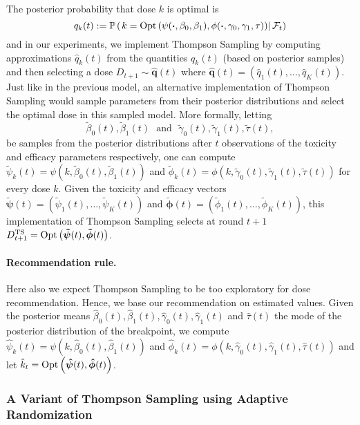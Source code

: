 The posterior probability that dose $k$ is optimal is 
\[{q}_k(t) := \mathbb{P}\left( \left.k = \mathrm{Opt}\left( \psi(\bm\cdot, \beta_0,\beta_1),\phi(\bm\cdot, \gamma_0,\gamma_1,\tau)\right) \right|\mathcal{F}_{t}\right)\]
and in our experiments, we implement Thompson Sampling by computing approximations $\hat{q}_k(t)$ from the quantities $q_k(t)$ (based on posterior samples) and then selecting a dose $D_{t+1}\sim \bm{\hat{q}}(t)$ where  $\bm{\hat{q}}(t) = (\hat{q}_1(t),\dots,\hat{q}_K(t))$. Just like in the previous model, an alternative implementation of Thompson Sampling would sample parameters from their posterior distributions and select the optimal dose in this sampled model. More formally, letting 
\begin{equation}\tilde{\beta}_0(t), \tilde{\beta}_1(t) \ \ \ \text{and} \ \ \ \tilde{\gamma}_0(t), \tilde{\gamma}_1(t), \tilde{\tau}(t),\label{eq:PosteriorSamples}\end{equation}
be samples from the posterior distributions after $t$ observations of the toxicity and efficacy parameters respectively, one can compute $\tilde{\psi}_k(t) = \psi(k,\tilde{\beta}_0(t),\tilde{\beta}_1(t))$ and $\tilde{\phi}_k(t) = \phi(k,\tilde{\gamma}_0(t),\tilde{\gamma}_1(t),\tilde{\tau}(t))$ for every dose $k$. Given the toxicity and efficacy vectors $\bm{\tilde{\psi}}(t) = (\tilde{\psi}_1(t),\dots,\tilde{\psi}_K(t))$ and $\bm {\tilde{\phi}}(t) = (\tilde{\phi}_1(t),\dots,\tilde{\phi}_K(t))$, this implementation of Thompson Sampling selects at round $t+1$ $D_{t+1}^{\text{TS}} = \mathrm{Opt}\left(\bm{\tilde{\psi}}(t), \bm{\tilde{\phi}}(t)\right)$.

\paragraph{Recommendation rule.}Here also we expect Thompson Sampling to be too exploratory for dose recommendation. Hence, we base our recommendation on estimated values. Given the posterior means 
$\hat{\beta}_0(t), \hat{\beta}_1(t),\hat{\gamma}_0(t),\hat{\gamma}_1(t)$ and $\hat{\tau}(t)$ the mode of the posterior distribution of the breakpoint, we compute  
$\hat{\psi}_k(t) = \psi(k,\hat{\beta}_0(t),\hat{\beta}_1(t))$ and $\hat{\phi}_k(t) = \phi(k,\hat{\gamma}_0(t),\hat{\gamma}_1(t),\hat{\tau}(t))$ and let $\hat{k}_t = \mathrm{Opt}\left(\bm{\hat{\psi}}(t), \bm{\hat{\phi}}(t)\right)$.


\subsubsection{A Variant of Thompson Sampling using Adaptive Randomization}

